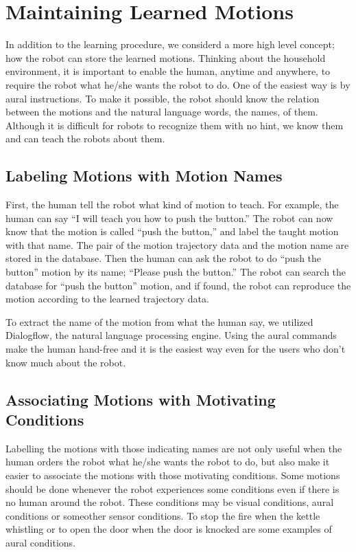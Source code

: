 \section{Maintaining Learned Motions}
In addition to the learning procedure, we considerd a more high level concept; how the robot can store the learned motions. Thinking about the household environment, it is important to enable the human, anytime and anywhere, to require the robot what he/she wants the robot to do. One of the easiest way is by aural instructions. To make it possible, the robot should know the relation between the motions and the natural language words, the names, of them. Although it is difficult for robots to recognize them with no hint, we know them and can teach the robots about them. %

\subsection{Labeling Motions with Motion Names}
First, the human tell the robot what kind of motion to teach. For example, the human can say ``I will teach you how to push the button.'' The robot can now know that the motion is called ``push the button,'' and label the taught motion with that name. The pair of the motion trajectory data and the motion name are stored in the database. Then the human can ask the robot to do ``push the button'' motion by its name; ``Please push the button.'' The robot can search the database for ``push the button'' motion, and if found, the robot can reproduce the motion according to the learned trajectory data.\par
To extract the name of the motion from what the human say, we utilized Dialogflow, the natural language processing engine. Using the aural commands make the human hand-free and it is the easiest way even for the users who don't know much about the robot.

\subsection{Associating Motions with Motivating Conditions}
Labelling the motions with those indicating names are not only useful when the human orders the robot what he/she wants the robot to do, but also make it easier to associate the motions with those motivating conditions. Some motions should be done whenever the robot experiences some conditions even if there is no human around the robot. These conditions may be visual conditions, aural conditions or someother sensor conditions. To stop the fire when the kettle whistling or to open the door when the door is knocked are some examples of aural conditions.
